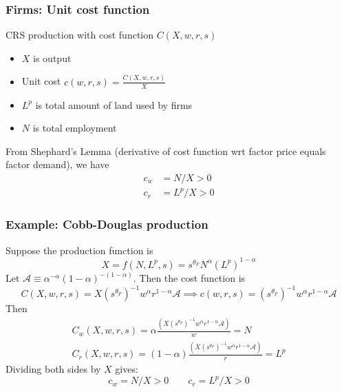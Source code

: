 \documentclass[11pt,notes=hide,aspectratio=169]{beamer}
\begin{document}
\begin{frame}
\frametitle{Firms: Unit cost function}
CRS production with cost function $C(X, w,r,s)$ 
\begin{itemize}
\item  $X$ is output
\item Unit cost $c(w, r, s)=\frac{C(X,w,r,s)}{X}$
\item $L^p$ is total amount of land used by firms
\item $N$ is total employment \medskip
\end{itemize}
From Shephard's Lemma (derivative of cost function wrt factor price equals factor demand), we have
\begin{align*}
c_w &= N/X >0 \\
c_r &= L^p/X >0
\end{align*}
\end{frame}
\begin{frame}
\frametitle{Example: Cobb-Douglas production}
Suppose the production function is
$$X=f(N,L^p,s)= s^{\theta_F} N^\alpha (L^p)^{1-\alpha}$$
Let $\mathcal{A} \equiv \alpha^{-\alpha} (1-\alpha)^{-(1-\alpha)}$.
Then the cost function is
\begin{equation*}
C(X,w,r,s) 
= X (s^{\theta_F})^{-1}w^\alpha r^{1-\alpha} \mathcal{A}
\implies
c(w,r,s)
=(s^{\theta_F})^{-1}w^\alpha r^{1-\alpha} \mathcal{A}
\end{equation*}
Then 
\begin{align*}
C_w(X,w,r,s) = \alpha \frac{\left(X (s^{\theta_F})^{-1}w^\alpha r^{1-\alpha} \mathcal{A} \right)}{w} = N \\
C_r(X,w,r,s) = (1-\alpha) \frac{\left(X (s^{\theta_F})^{-1}w^\alpha r^{1-\alpha} \mathcal{A} \right)}{r} = L^p
\end{align*}
Dividing both sides by $X$ gives:
\begin{equation*}
c_w = N/X >0
\qquad
c_r = L^p/X >0
\end{equation*}
\end{frame}
\end{document}

